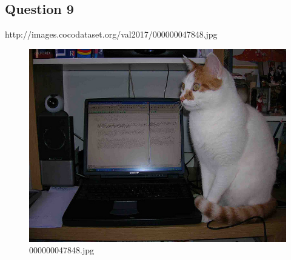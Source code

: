 \subsection*{Question 9}
http://images.cocodataset.org/val2017/000000047848.jpg
    \begin{figure}[h]
        \centering
        \includegraphics[width=0.8\linewidth]{../image set/easy/000000047848.jpg}
        \caption{000000047848.jpg}
    \end{figure}
